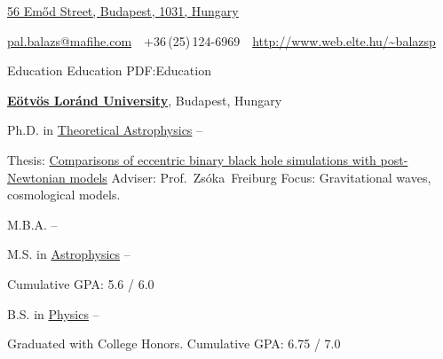 \documentclass[letterpaper,yyyyMMM,nonstopmode]{simpleresumecv}
\newcommand{\CVAuthor}{Balázs Pál}
\newcommand{\CVWebpage}{http://www.web.elte.hu/~balazsp}
\begin{document}

\Title{\CVAuthor}

\begin{SubTitle}
\href{https://www.google.hu/maps/place/Budapest,+Emőd+u.+56,+1031/}
{56 Emőd Street, Budapest, 1031, Hungary}
\par
\href{mailto:pal.balazs@mafihe.com}
{pal.balazs@mafihe.com}
\,\SubBulletSymbol\,
+36\,(25)\,124-6969
\,\SubBulletSymbol\,
\href{\CVWebpage}
{\url{\CVWebpage}}
\end{SubTitle}

\begin{Body}


\Section
{Education}
{Education}
{PDF:Education}

\Entry
\href{https://www.elte.hu/}
{\textbf{Eötvös Loránd University}},
Budapest, Hungary

\Gap
\BulletItem
Ph.D. in
\href{https://fizika.elte.hu/hu/index.php?page=tanszek&tid=1}
{Theoretical Astrophysics}
\hfill
{} --
\begin{Detail}
\SubBulletItem
Thesis:
\href{https://arxiv.org/pdf/0806.1037.pdf}
{Comparisons of eccentric binary black hole simulations with post-Newtonian models}
\SubBulletItem
Adviser:
Prof.~Zsóka~Freiburg
\SubBulletItem
Focus:
Gravitational waves, cosmological models.
\end{Detail}

\Gap
\BulletItem
M.B.A.
\hfill
{} --

\Gap
\BulletItem
M.S. in
\href{https://fizika.elte.hu/hu/index.php?page=tanszek&tid=1}
{\textsf{Astrophysics}}
\hfill
{} --
\begin{Detail}
\SubBulletItem
Cumulative GPA: 5.6 / 6.0
\end{Detail}

\Gap
\BulletItem
B.S. in
\href{https://fizika.elte.hu/hu/index.php?page=tanszek&tid=1}
{Physics}
\hfill
{} --
\begin{Detail}
\SubBulletItem
Graduated with College Honors.
\SubBulletItem
Cumulative GPA: 6.75 / 7.0
\end{Detail}



\end{Body}
\end{document}
